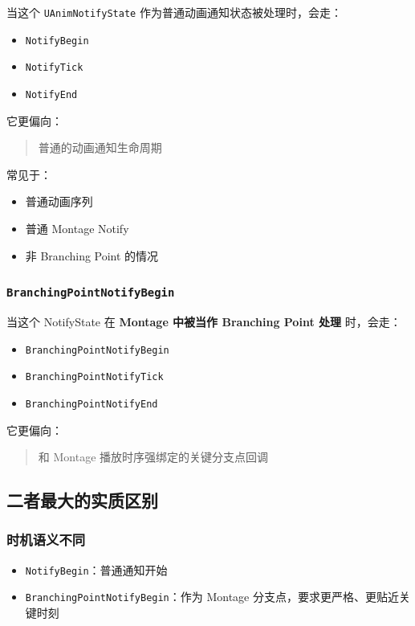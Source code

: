 当这个 \verb|UAnimNotifyState| 作为普通动画通知状态被处理时，会走：

\begin{itemize}
	\item \verb|NotifyBegin|
	\item \verb|NotifyTick|
	\item \verb|NotifyEnd|
\end{itemize}

它更偏向：

\begin{quote}
	普通的动画通知生命周期
\end{quote}

常见于：

\begin{itemize}
	\item 普通动画序列
	\item 普通 Montage Notify
	\item 非 Branching Point 的情况
\end{itemize}

\subsubsection{\texttt{BranchingPointNotifyBegin}}

当这个 NotifyState 在 \textbf{Montage 中被当作 Branching Point 处理} 时，会走：

\begin{itemize}
	\item \verb|BranchingPointNotifyBegin|
	\item \verb|BranchingPointNotifyTick|
	\item \verb|BranchingPointNotifyEnd|
\end{itemize}

它更偏向：

\begin{quote}
	和 Montage 播放时序强绑定的关键分支点回调
\end{quote}

\subsection{二者最大的实质区别}

\subsubsection{时机语义不同}

\begin{itemize}
	\item \verb|NotifyBegin|：普通通知开始
	\item \verb|BranchingPointNotifyBegin|：作为 Montage 分支点，要求更严格、更贴近关键时刻
\end{itemize}

